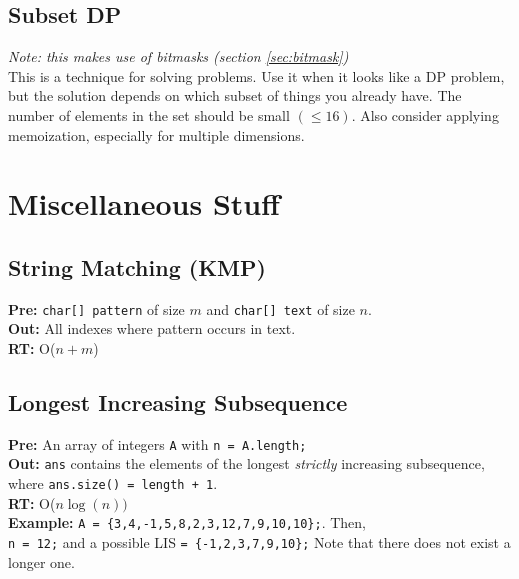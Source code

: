 \documentclass[a4paper,10pt]{article}
\begin{document}
\begin{multicols}{2}
\subsection{Subset DP}
\textit{Note: this makes use of bitmasks (section \ref{sec:bitmask})}\\
This is a technique for solving problems. Use it when it looks like a DP problem, but the solution depends on which subset of things you already have. The number of elements in the set should be small $(\leq 16)$. Also consider applying memoization, especially for multiple dimensions.
\section{Miscellaneous Stuff}
%

\subsection{String Matching (KMP)}
\textbf{Pre:} \lstinline|char[] pattern| of size $m$ and \lstinline|char[] text| of size $n$.\\
\textbf{Out:} All indexes where pattern occurs in text.\\
\textbf{RT:} O($n+m$)


\subsection{Longest Increasing Subsequence}
\textbf{Pre:} An array of integers \lstinline|A| with \lstinline|n = A.length;|\\
\textbf{Out:} \lstinline|ans| contains the elements of the longest \textit{strictly} increasing subsequence, where \lstinline|ans.size() = length + 1|.\\
\textbf{RT:} O($n\log(n))$\\
\textbf{Example:} \lstinline|A = {3,4,-1,5,8,2,3,12,7,9,10,10};|. Then, 
\\\lstinline|n = 12;| and a possible LIS \lstinline|= {-1,2,3,7,9,10};| Note that there does not exist a longer one.



\end{multicols}
\end{document}
